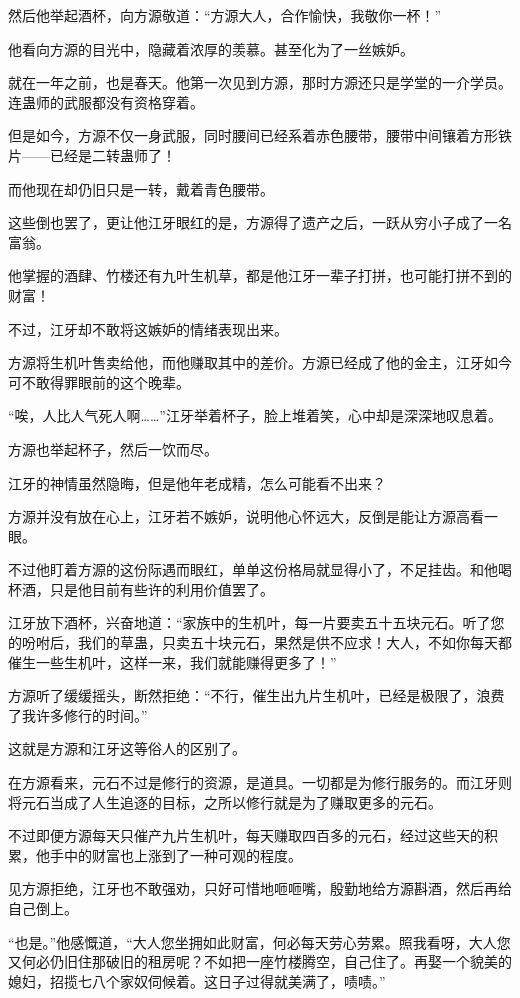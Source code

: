 \begin{this_body}
然后他举起酒杯，向方源敬道：“方源大人，合作愉快，我敬你一杯！”

他看向方源的目光中，隐藏着浓厚的羡慕。甚至化为了一丝嫉妒。

就在一年之前，也是春天。他第一次见到方源，那时方源还只是学堂的一介学员。连蛊师的武服都没有资格穿着。

但是如今，方源不仅一身武服，同时腰间已经系着赤色腰带，腰带中间镶着方形铁片——已经是二转蛊师了！

而他现在却仍旧只是一转，戴着青色腰带。

这些倒也罢了，更让他江牙眼红的是，方源得了遗产之后，一跃从穷小子成了一名富翁。

他掌握的酒肆、竹楼还有九叶生机草，都是他江牙一辈子打拼，也可能打拼不到的财富！

不过，江牙却不敢将这嫉妒的情绪表现出来。

方源将生机叶售卖给他，而他赚取其中的差价。方源已经成了他的金主，江牙如今可不敢得罪眼前的这个晚辈。

“唉，人比人气死人啊……”江牙举着杯子，脸上堆着笑，心中却是深深地叹息着。

方源也举起杯子，然后一饮而尽。

江牙的神情虽然隐晦，但是他年老成精，怎么可能看不出来？

方源并没有放在心上，江牙若不嫉妒，说明他心怀远大，反倒是能让方源高看一眼。

不过他盯着方源的这份际遇而眼红，单单这份格局就显得小了，不足挂齿。和他喝杯酒，只是他目前有些许的利用价值罢了。

江牙放下酒杯，兴奋地道：“家族中的生机叶，每一片要卖五十五块元石。听了您的吩咐后，我们的草蛊，只卖五十块元石，果然是供不应求！大人，不如你每天都催生一些生机叶，这样一来，我们就能赚得更多了！”

方源听了缓缓摇头，断然拒绝：“不行，催生出九片生机叶，已经是极限了，浪费了我许多修行的时间。”

这就是方源和江牙这等俗人的区别了。

在方源看来，元石不过是修行的资源，是道具。一切都是为修行服务的。而江牙则将元石当成了人生追逐的目标，之所以修行就是为了赚取更多的元石。

不过即便方源每天只催产九片生机叶，每天赚取四百多的元石，经过这些天的积累，他手中的财富也上涨到了一种可观的程度。

见方源拒绝，江牙也不敢强劝，只好可惜地咂咂嘴，殷勤地给方源斟酒，然后再给自己倒上。

“也是。”他感慨道，“大人您坐拥如此财富，何必每天劳心劳累。照我看呀，大人您又何必仍旧住那破旧的租房呢？不如把一座竹楼腾空，自己住了。再娶一个貌美的媳妇，招揽七八个家奴伺候着。这日子过得就美满了，啧啧。”


\end{this_body}
